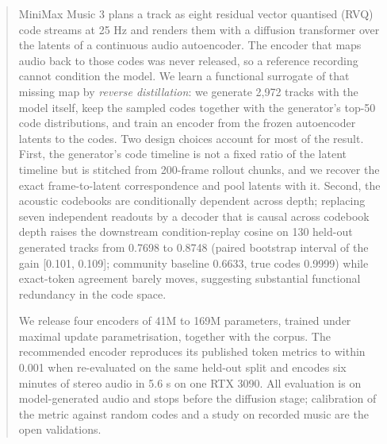 \begin{abstract}
MiniMax Music 3 plans a track as eight residual vector quantised (RVQ) code streams at 25 Hz and renders them with a diffusion transformer over the latents of a continuous audio autoencoder. The encoder that maps audio back to those codes was never released, so a reference recording cannot condition the model. We learn a functional surrogate of that missing map by \emph{reverse distillation}: we generate 2,972 tracks with the model itself, keep the sampled codes together with the generator's top-50 code distributions, and train an encoder from the frozen autoencoder latents to the codes. Two design choices account for most of the result. First, the generator's code timeline is not a fixed ratio of the latent timeline but is stitched from 200-frame rollout chunks, and we recover the exact frame-to-latent correspondence and pool latents with it. Second, the acoustic codebooks are conditionally dependent across depth; replacing seven independent readouts by a decoder that is causal across codebook depth raises the downstream condition-replay cosine on 130 held-out generated tracks from 0.7698 to 0.8748 (paired bootstrap interval of the gain [0.101, 0.109]; community baseline 0.6633, true codes 0.9999) while exact-token agreement barely moves, suggesting substantial functional redundancy in the code space.

We release four encoders of 41M to 169M parameters, trained under maximal update parametrisation, together with the corpus. The recommended encoder reproduces its published token metrics to within 0.001 when re-evaluated on the same held-out split and encodes six minutes of stereo audio in 5.6 s on one RTX 3090. All evaluation is on model-generated audio and stops before the diffusion stage; calibration of the metric against random codes and a study on recorded music are the open validations.
\end{abstract}
